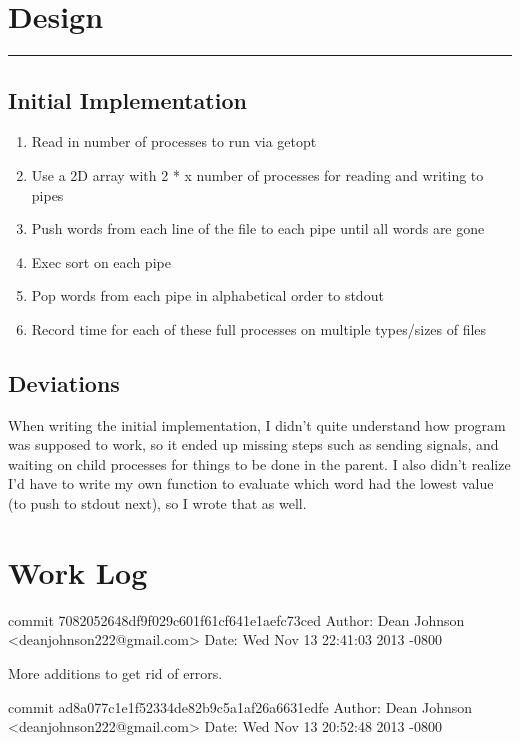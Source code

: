 \documentclass[fleqn,10pt,titlepage]{article}
\begin{document}
\section{Design}
\hrule
\subsection{Initial Implementation}
\begin{enumerate}
\item Read in number of processes to run via getopt \\
\item Use a 2D array with 2 * x number of processes for reading and writing to pipes \\
\item Push words from each line of the file to each pipe until all words are gone \\
\item Exec sort on each pipe \\
\item Pop words from each pipe in alphabetical order to stdout \\
\item Record time for each of these full processes on multiple types/sizes of files \\
\end{enumerate}
\subsection{Deviations}
When writing the initial implementation, I didn't quite understand how program was supposed to work,
so it ended up missing steps such as sending signals, and waiting on child processes for things to be
done in the parent. I also didn't realize I'd have to write my own function to evaluate which word had
the lowest value (to push to stdout next), so I wrote that as well.
\clearpage

\section{Work Log}
commit 7082052648df9f029c601f61cf641e1aefc73ced
Author: Dean Johnson <deanjohnson222@gmail.com>
Date:   Wed Nov 13 22:41:03 2013 -0800

    More additions to get rid of errors.

commit ad8a077c1e1f52334de82b9c5a1af26a6631edfe
Author: Dean Johnson <deanjohnson222@gmail.com>
Date:   Wed Nov 13 20:52:48 2013 -0800
\end{document}

